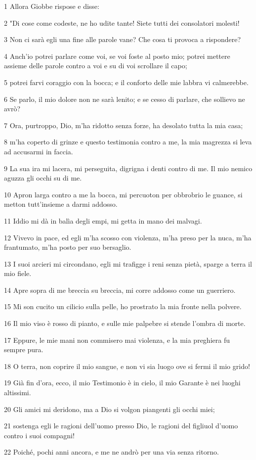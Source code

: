 \par 1 Allora Giobbe rispose e disse:
\par 2 "Di cose come codeste, ne ho udite tante! Siete tutti dei consolatori molesti!
\par 3 Non ci sarà egli una fine alle parole vane? Che cosa ti provoca a rispondere?
\par 4 Anch'io potrei parlare come voi, se voi foste al posto mio; potrei mettere assieme delle parole contro a voi e su di voi scrollare il capo;
\par 5 potrei farvi coraggio con la bocca; e il conforto delle mie labbra vi calmerebbe.
\par 6 Se parlo, il mio dolore non ne sarà lenito; e se cesso di parlare, che sollievo ne avrò?
\par 7 Ora, purtroppo, Dio, m'ha ridotto senza forze, ha desolato tutta la mia casa;
\par 8 m'ha coperto di grinze e questo testimonia contro a me, la mia magrezza si leva ad accusarmi in faccia.
\par 9 La sua ira mi lacera, mi perseguita, digrigna i denti contro di me. Il mio nemico aguzza gli occhi su di me.
\par 10 Apron larga contro a me la bocca, mi percuoton per obbrobrio le guance, si metton tutt'insieme a darmi addosso.
\par 11 Iddio mi dà in balìa degli empi, mi getta in mano dei malvagi.
\par 12 Vivevo in pace, ed egli m'ha scosso con violenza, m'ha preso per la nuca, m'ha frantumato, m'ha posto per suo bersaglio.
\par 13 I suoi arcieri mi circondano, egli mi trafigge i reni senza pietà, sparge a terra il mio fiele.
\par 14 Apre sopra di me breccia su breccia, mi corre addosso come un guerriero.
\par 15 Mi son cucito un cilicio sulla pelle, ho prostrato la mia fronte nella polvere.
\par 16 Il mio viso è rosso di pianto, e sulle mie palpebre si stende l'ombra di morte.
\par 17 Eppure, le mie mani non commisero mai violenza, e la mia preghiera fu sempre pura.
\par 18 O terra, non coprire il mio sangue, e non vi sia luogo ove si fermi il mio grido!
\par 19 Già fin d'ora, ecco, il mio Testimonio è in cielo, il mio Garante è nei luoghi altissimi.
\par 20 Gli amici mi deridono, ma a Dio si volgon piangenti gli occhi miei;
\par 21 sostenga egli le ragioni dell'uomo presso Dio, le ragioni del figliuol d'uomo contro i suoi compagni!
\par 22 Poiché, pochi anni ancora, e me ne andrò per una via senza ritorno.

